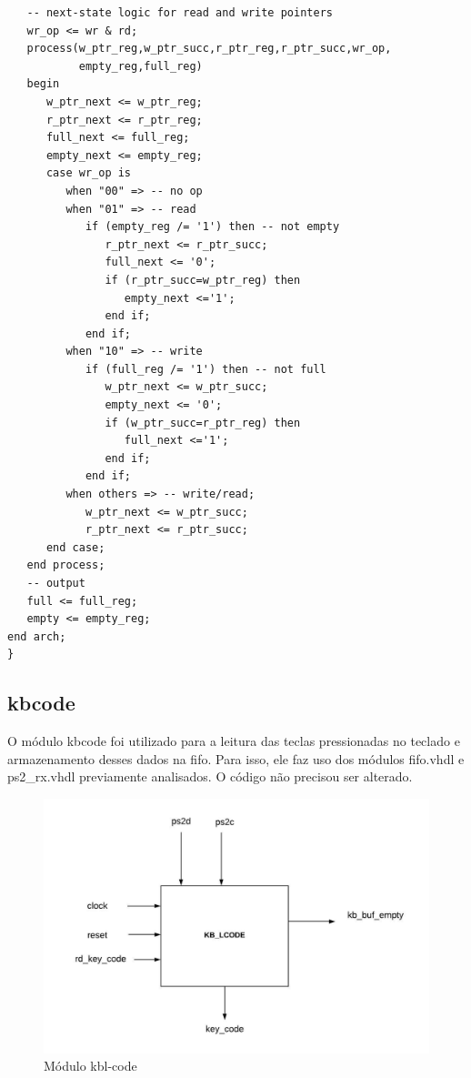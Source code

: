 \documentclass[a4paper,12pt,twoside]{article}
\begin{document}
\begin{lstlisting}
   -- next-state logic for read and write pointers
   wr_op <= wr & rd;
   process(w_ptr_reg,w_ptr_succ,r_ptr_reg,r_ptr_succ,wr_op,
           empty_reg,full_reg)
   begin
      w_ptr_next <= w_ptr_reg;
      r_ptr_next <= r_ptr_reg;
      full_next <= full_reg;
      empty_next <= empty_reg;
      case wr_op is
         when "00" => -- no op
         when "01" => -- read
            if (empty_reg /= '1') then -- not empty
               r_ptr_next <= r_ptr_succ;
               full_next <= '0';
               if (r_ptr_succ=w_ptr_reg) then
                  empty_next <='1';
               end if;
            end if;
         when "10" => -- write
            if (full_reg /= '1') then -- not full
               w_ptr_next <= w_ptr_succ;
               empty_next <= '0';
               if (w_ptr_succ=r_ptr_reg) then
                  full_next <='1';
               end if;
            end if;
         when others => -- write/read;
            w_ptr_next <= w_ptr_succ;
            r_ptr_next <= r_ptr_succ;
      end case;
   end process;
   -- output
   full <= full_reg;
   empty <= empty_reg;
end arch;
} \end{lstlisting}


\subsection{kbcode}
O módulo kbcode foi utilizado para a leitura das teclas pressionadas no teclado e armazenamento desses dados na fifo. Para isso, ele faz uso dos módulos fifo.vhdl e ps2\_rx.vhdl previamente analisados. O código não precisou ser alterado. 


\begin{figure}[H]
\centering
\includegraphics[scale=0.6]{kblcode.jpeg}
\caption{Módulo kbl-code}
\label{fig:kblcode}
\end{figure}
\end{document}
